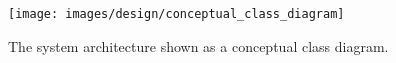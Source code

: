 
\begin{figure}[H]
	\centering
    \texttt{[image: images/design/conceptual\_class\_diagram]}
    \caption[Conceptual class diagram]{The system architecture shown as a conceptual class diagram.}
    \label{fig:conceptual_class_diagram}
\end{figure}
